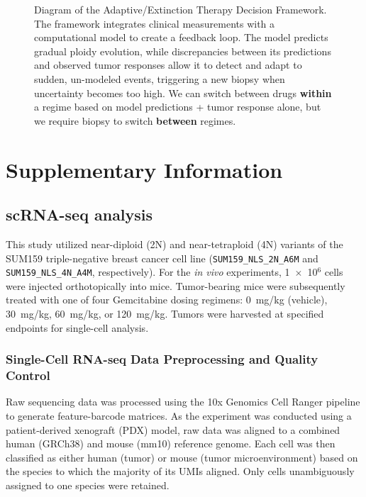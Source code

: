 \documentclass{article}
\begin{document}
\begin{figure}[h!]
{
}
\caption{Diagram of the Adaptive/Extinction Therapy Decision Framework. The framework integrates clinical measurements with a computational model to create a feedback loop. The model predicts gradual ploidy evolution, while discrepancies between its predictions and observed tumor responses allow it to detect and adapt to sudden, un-modeled events, triggering a new biopsy when uncertainty becomes too high. \color{blue} We can switch between drugs \textbf{within} a regime based on model predictions + tumor response alone, but we require biopsy to switch \textbf{between} regimes.}
\label{fig:framework_diagram}
\end{figure}












\section{Supplementary Information}

\subsection{scRNA-seq analysis}

This study utilized near-diploid (2N) and near-tetraploid (4N) variants of the SUM159 triple-negative breast cancer cell line (\texttt{SUM159\_NLS\_2N\_A6M} and \texttt{SUM159\_NLS\_4N\_A4M}, respectively). For the \textit{in vivo} experiments, 1~$\times$~10$^6$ cells were injected orthotopically into mice. Tumor-bearing mice were subsequently treated with one of four Gemcitabine dosing regimens: 0~mg/kg (vehicle), 30~mg/kg, 60~mg/kg, or 120~mg/kg. Tumors were harvested at specified endpoints for single-cell analysis.

\subsubsection{Single-Cell RNA-seq Data Preprocessing and Quality Control}
Raw sequencing data was processed using the 10x Genomics Cell Ranger pipeline to generate feature-barcode matrices. As the experiment was conducted using a patient-derived xenograft (PDX) model, raw data was aligned to a combined human (GRCh38) and mouse (mm10) reference genome. Each cell was then classified as either human (tumor) or mouse (tumor microenvironment) based on the species to which the majority of its UMIs aligned. Only cells unambiguously assigned to one species were retained. 
\end{document}

